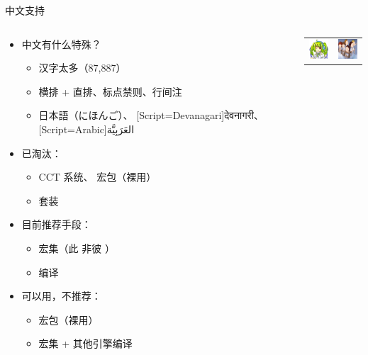 \begin{frame}{中文支持}
\begin{columns}
\begin{column}{0.65\textwidth}
  \begin{itemize}
    \item 中文有什么特殊？\pause
      \begin{itemize}
        \item 汉字太多（87,887）\pause
        \item 横排 + 直排、标点禁则、行间注  \pause
        \item {日本語（にほんご）}、
              {[Script=Devanagari]देवनागरी}、
              {[Script=Arabic]العَرَبِيَّة‎}
      \end{itemize} \pause
    \item 已淘汰：
      \begin{itemize}
        \item CCT 系统、 宏包（裸用）
        \item \CTeX{} 套装
      \end{itemize} \pause
    \item 目前推荐手段：
      \begin{itemize}
        \item \alert{ 宏集}（此  非彼 \CTeX{}）
        \item \XeLaTeX{} 编译
      \end{itemize} \pause
    \item 可以用，不推荐：
      \begin{itemize}
        \item {} 宏包（裸用）
        \item {} 宏集 + 其他引擎编译
      \end{itemize}
  \end{itemize}
\end{column} \pause
\begin{column}{0.33\textwidth}
  \tiny
  \begin{tabular}{cc}
    \includegraphics[width=1cm]{figures/leoliu.png}        &
    \includegraphics[width=1cm]{figures/qinglee.jpg}       \\

\end{tabular}
\end{column}
\end{columns}
\end{frame}
